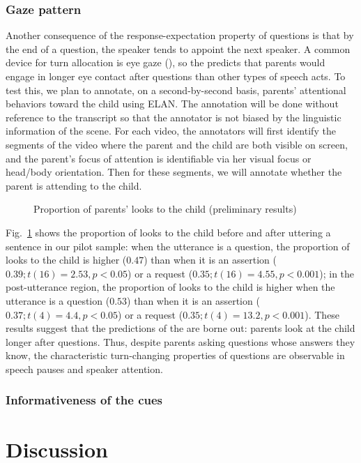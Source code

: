 
\subsubsection{Gaze pattern}
\label{sec:engsp:results:gaze}



Another consequence of the response-expectation property of questions is that by the end of a question, the speaker tends to appoint the next speaker. A common device for turn allocation is eye gaze (\citealt{argyle1972gaze, kendon1967gaze,duncan1979gaze, rossano2009gaze}), so the \hypos{} predicts that parents would engage in longer eye contact after questions than other types of speech acts. To test this, we plan to annotate, on a second-by-second basis, parents' attentional behaviors toward the child using ELAN. The annotation will be done without reference to the transcript so that the annotator is not biased by the linguistic information of the scene. For each video, the annotators will first identify the segments of the video where the parent and the child are both visible on screen, and the parent’s focus of attention is identifiable via her visual focus or head/body orientation. Then for these segments, we will annotate whether the parent is attending to the child.  


\begin{figure}[H]
\label{fg:attention}
\begin{center}
	\caption{Proportion of parents' looks to the child (preliminary results)}
\end{center}
\end{figure}


Fig.~\ref{fg:attention} shows the proportion of looks to the child before and after uttering a sentence in our pilot sample: when the utterance is a question, the proportion of looks to the child is higher ($0.47$) than when it is an assertion ($0.39; t(16) = 2.53, p <0.05$) or a request ($0.35; t(16)= 4.55, p<0.001$); in the post-utterance region, the proportion of looks to the child is higher when the utterance is a question ($0.53$) than when it is an assertion ($0.37; t(4) = 4.4, p<0.05$) or a request ($0.35; t(4) = 13.2, p<0.001$). These results suggest that the predictions of the \hypos{} are borne out: parents look at the child longer after questions. Thus, despite parents asking questions whose answers they know, the characteristic turn-changing properties of questions are observable in speech pauses and speaker attention. 


\subsubsection{Informativeness of the cues}
\label{sec:engsp:results:stats}

\section{Discussion}
\label{sec:engsp:discussion}


